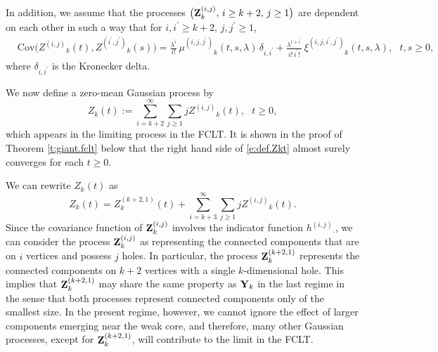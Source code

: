 \documentclass[11pt]{amsart}
\numberwithin{equation}{section}
\theoremstyle{plain}
\theoremstyle{definition}
\begin{document}
In addition, we assume that the processes $\bigl( {{\bf Z}}_k^{(i,j)}, \, i \geq k+2, \, j\geq1 \bigr)$ are dependent on each other in such a way that for $i, {i^{\prime}} \geq k+2$, $j, {j^{\prime}} \geq 1$,
\begin{align*}
&\text{Cov} \bigl( {Z^{(i,j)}}_k(t), {Z^{({i^{\prime}},{j^{\prime}})}}_k(s) \bigr)
= \frac{\lambda^i}{i!}\, {\mu^{(i,j,{j^{\prime}})}}_k(t,s,\lambda)\, \delta_{i,{i^{\prime}}} + \frac{\lambda^{i+{i^{\prime}}}}{i!\, {i^{\prime}} !}\, {\xi^{(i,j,{i^{\prime}},{j^{\prime}})}}_k(t,s,\lambda), \ \ \ t,s \geq 0,
\end{align*}
where $\delta_{i,{i^{\prime}}}$ is the Kronecker delta.

We now  define a zero-mean Gaussian process by
\begin{equation}  \label{e:def.Zkt}
Z_k(t) := \sum_{i=k+2}^\infty \sum_{j\geq1} j {Z^{(i,j)}}_k(t), \ \ \ t\geq0,
\end{equation}
which appears in the limiting process in the FCLT.
It is shown in the proof of Theorem \ref{t:giant.fclt} below that the right hand side of \eqref{e:def.Zkt}  almost surely converges for each $t\geq0$.

We can rewrite $Z_k(t)$ as
$$  
Z_k(t) = Z_k^{(k+2,1)}(t) + \sum_{i=k+3}^\infty \sum_{j\geq1} j {Z^{(i,j)}}_k(t).
$$
Since the covariance function of ${{\bf Z}}_k^{(i,j)}$ involves the indicator function ${h^{(i,j)}}_\cdot$, we can consider the process ${{\bf Z}}_k^{(i,j)}$ as representing the connected components that are on $i$ vertices and possess $j$ holes. In particular, the process ${{\bf Z}}_k^{(k+2,1)}$ represents the connected components on $k+2$ vertices with a single $k$-dimensional hole. This implies that ${{\bf Z}}_k^{(k+2,1)}$ may share the same property as ${{\bf Y}}_k$ in the last regime in the sense that both processes represent connected components only of the smallest size.
In the present regime, however, we cannot ignore the effect of larger components emerging near the weak core, and therefore, many other Gaussian processes, except for ${{\bf Z}}_k^{(k+2,1)}$, will contribute to the limit in the FCLT.
\end{document}
